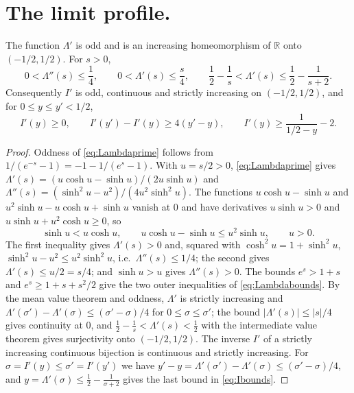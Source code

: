 \documentclass{math}
\newcommand{\R}{\mathbb R}
\begin{document}
\section{The limit profile.}\label{sec:profile}
\begin{lemma}\label{lem:Lambda}
The function $\Lambda'$ is odd and is an increasing homeomorphism of $\R$ onto $(-1/2,1/2)$. For $s>0$,
\begin{equation}\label{eq:Lambdabounds}
0<\Lambda''(s)\le\frac14,\qquad 0<\Lambda'(s)\le\frac s4,\qquad \frac12-\frac1s<\Lambda'(s)\le\frac12-\frac1{s+2} .
\end{equation}
Consequently $I'$ is odd, continuous and strictly increasing on $(-1/2,1/2)$, and for $0\le y\le y'<1/2$,
\begin{equation}\label{eq:Ibounds}
I'(y)\ge0,\qquad I'(y')-I'(y)\ge4(y'-y),\qquad I'(y)\ge\frac1{1/2-y}-2 .
\end{equation}
\end{lemma}

\begin{proof}
Oddness of \eqref{eq:Lambdaprime} follows from $1/(e^{-s}-1)=-1-1/(e^s-1)$. With $u=s/2>0$, \eqref{eq:Lambdaprime} gives $\Lambda'(s)=(u\cosh u-\sinh u)/(2u\sinh u)$ and $\Lambda''(s)=(\sinh^2u-u^2)/(4u^2\sinh^2u)$. The functions $u\cosh u-\sinh u$ and $u^2\sinh u-u\cosh u+\sinh u$ vanish at $0$ and have derivatives $u\sinh u>0$ and $u\sinh u+u^2\cosh u\ge0$, so
\begin{equation}\label{eq:hyp}
\sinh u<u\cosh u,\qquad u\cosh u-\sinh u\le u^2\sinh u,\qquad u>0 .
\end{equation}
The first inequality gives $\Lambda'(s)>0$ and, squared with $\cosh^2u=1+\sinh^2u$, $\sinh^2u-u^2\le u^2\sinh^2u$, i.e.\ $\Lambda''(s)\le1/4$; the second gives $\Lambda'(s)\le u/2=s/4$; and $\sinh u>u$ gives $\Lambda''(s)>0$. The bounds $e^s>1+s$ and $e^s\ge1+s+s^2/2$ give the two outer inequalities of \eqref{eq:Lambdabounds}. By the mean value theorem and oddness, $\Lambda'$ is strictly increasing and $\Lambda'(\sigma')-\Lambda'(\sigma)\le(\sigma'-\sigma)/4$ for $0\le\sigma\le\sigma'$; the bound $|\Lambda'(s)|\le|s|/4$ gives continuity at $0$, and $\frac12-\frac1s<\Lambda'(s)<\frac12$ with the intermediate value theorem gives surjectivity onto $(-1/2,1/2)$. The inverse $I'$ of a strictly increasing continuous bijection is continuous and strictly increasing. For $\sigma=I'(y)\le\sigma'=I'(y')$ we have $y'-y=\Lambda'(\sigma')-\Lambda'(\sigma)\le(\sigma'-\sigma)/4$, and $y=\Lambda'(\sigma)\le\frac12-\frac1{\sigma+2}$ gives the last bound in \eqref{eq:Ibounds}.
\end{proof}
\end{document}
